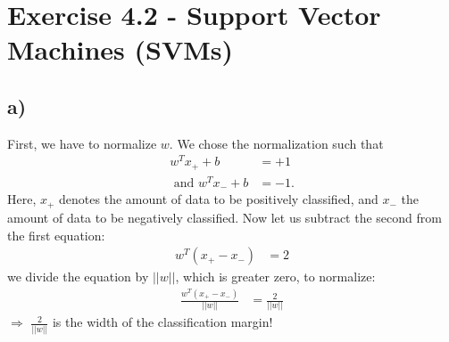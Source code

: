 \documentclass[a4paper]{article}
\begin{document}
\newpage
\section*{Exercise 4.2 - Support Vector Machines (SVMs)}
    \subsection*{a)}
        First, we have to normalize $w$.
        We chose the normalization such that 
        \begin{align}
            w^T x_+ + b &= +1\\ \text{ and }
            w^T x_- + b &= -1.
        \end{align}
        Here, $x_+$ denotes the amount of data to be positively classified, and $x_-$ the amount of data to be negatively classified.
        Now let us subtract the second from the first equation:
        \begin{align}
            w^T (x_+ - x_-) &= 2
        \end{align}
        we divide the equation by $||w||$, which is greater zero, to normalize:
        \begin{align}
            \frac{w^T (x_+ - x_-)}{||w||} &= \frac{2}{||w||}
        \end{align}
        $\Rightarrow$ $\frac{2}{||w||}$ is the width of the classification margin!
    
    
    
\end{document}
